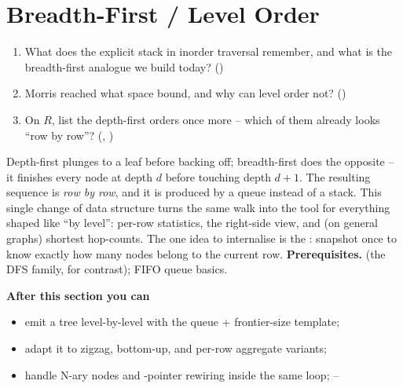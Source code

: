 \section{Breadth-First / Level Order}\label{sec:c03-bfs}

\begin{previouslybox}
\begin{enumerate}[nosep, leftmargin=1.6em]
  \item What does the explicit stack in inorder traversal remember, and what is the
        breadth-first analogue we build today? ()
  \item Morris reached what space bound, and why can level order not? ()
  \item On $R$, list the depth-first orders once more -- which of them already looks
        ``row by row''? (, )
\end{enumerate}
\end{previouslybox}

\begin{topicintro}
Depth-first plunges to a leaf before backing off; breadth-first does the opposite -- it
finishes every node at depth $d$ before touching depth $d{+}1$. The resulting sequence is
\emph{row by row}, and it is produced by a queue instead of a stack. This single change of
data structure turns the same walk into the tool for everything shaped like ``by level'':
per-row statistics, the right-side view, and (on general graphs) shortest hop-counts. The
one idea to internalise is the : snapshot  once to know
exactly how many nodes belong to the current row.
\textbf{Prerequisites.}  (the DFS family, for contrast); FIFO queue basics.

\textbf{After this section you can}
\begin{itemize}[nosep]
  \item emit a tree level-by-level with the queue + frontier-size template;         \hfill{}
  \item adapt it to zigzag, bottom-up, and per-row aggregate variants;              \hfill{}
  \item handle N-ary nodes and -pointer rewiring inside the same loop;   \hfill{}--
\end{itemize}
\end{topicintro}

